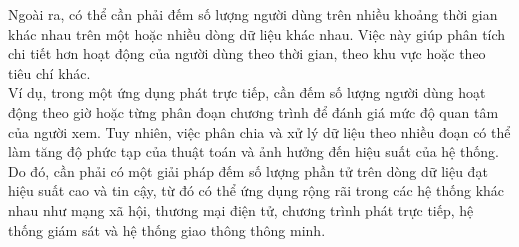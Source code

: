 \documentclass[letterpaper,13pt]{article}
\theoremstyle{mytheor}
\begin{document}
Ngoài ra, có thể cần phải đếm số lượng người dùng trên nhiều khoảng thời gian khác nhau trên một hoặc nhiều dòng dữ liệu khác nhau. 
Việc này giúp phân tích chi tiết hơn hoạt động của người dùng theo thời gian, theo khu vực hoặc theo tiêu chí khác.\\
Ví dụ, trong một ứng dụng phát trực tiếp, cần đếm số lượng người dùng hoạt động theo giờ hoặc từng phân đoạn chương trình 
để đánh giá mức độ quan tâm của người xem. Tuy nhiên, việc phân chia và xử lý dữ liệu theo nhiều đoạn có thể làm 
tăng độ phức tạp của thuật toán và ảnh hưởng đến hiệu suất của hệ thống. Do đó, cần phải có một giải pháp 
đếm số lượng phần tử trên dòng dữ liệu đạt hiệu suất cao và tin cậy, từ đó có thể ứng dụng rộng rãi trong các 
hệ thống khác nhau như mạng xã hội, thương mại điện tử, chương trình phát trực tiếp, hệ thống giám sát 
và hệ thống giao thông thông minh.
\end{document}
